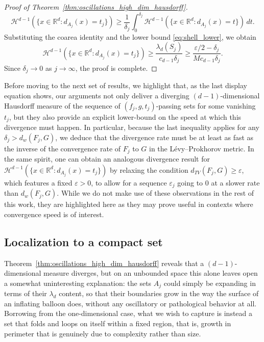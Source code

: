 \documentclass[12pt]{article}
\newcommand{\RR}{\mathbb{R}}
\begin{document}
\begin{proof}[Proof of Theorem~\ref{thm:oscillations_high_dim_hausdorff}]
\begin{equation*}
\mathcal{H}^{d-1}(\{x \in \RR^d : d_{A_j}(x) = t_j\}) \geq \frac{1}{\delta_j} \int_0^{\delta_j} \mathcal{H}^{d-1}(\{x \in \RR^d : d_{A_j}(x) = t\}) \, dt.
\end{equation*}
Substituting the coarea identity and the lower bound \eqref{eq:shell_lower}, we obtain
\begin{equation*}
\mathcal{H}^{d-1}(\{x \in \RR^d : d_{A_j}(x) = t_j\}) \geq \frac{\lambda_d(S_j)}{c_{d-1}\delta_j} \geq \frac{\varepsilon/2 - \delta_j}{M c_{d-1}\delta_j}.
\end{equation*}
Since $\delta_j \to 0$ as $j \to \infty$, the proof is complete.
\end{proof}

Before moving to the next set of results, we highlight that, as the last display equation shows, our arguments not only deliver a diverging $(d-1)$-dimensional Hausdorff measure of the sequence of $(f_j,g,t_j)$-passing sets for some vanishing $t_j$, but they also provide an explicit lower-bound on the speed at which this divergence must happen. In particular, because the last inequality applies for any $\delta_j>d_{w}(F_j,G)$, we deduce that the divergence rate must be at least as fast as the inverse of the convergence rate of $F_j$ to $G$ in the L\'evy--Prokhorov metric. In the same spirit, one can obtain an analogous divergence result for $\mathcal{H}^{d-1}(\{x \in \RR^d : d_{A_j}(x) = t_j\})$ by relaxing the condition $d_{TV}(F_j,G)\geq \varepsilon$, which features a fixed $\varepsilon>0$, to allow for a sequence $\varepsilon_j$ going to 0 at a slower rate than $d_{w}(F_j,G)$. While we do not make use of these observations in the rest of this work, they are highlighted here as they may prove useful in contexts where convergence speed is of interest.

\subsection{Localization to a compact set}\label{subsec:compact}

Theorem~\ref{thm:oscillations_high_dim_hausdorff} reveals that a $(d-1)$-dimensional measure
diverges, but on an unbounded space this alone leaves open a somewhat uninteresting explanation: the sets
$A_j$ could simply be expanding in terms of their $\lambda_d$ content, so that their boundaries grow in the way the surface of an
inflating balloon does, without any oscillatory or pathological behavior at all. Borrowing from the one-dimensional case, what we wish to capture is
instead a set that folds and loops on itself within a fixed region, that is, growth in perimeter
that is genuinely due to complexity rather than size.
\end{document}
